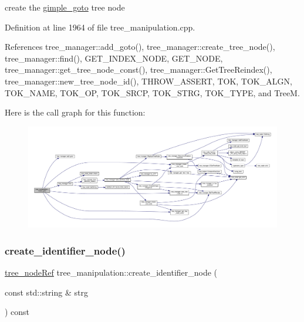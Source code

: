 create the \hyperlink{structgimple__goto}{gimple\+\_\+goto} tree node 

Definition at line 1964 of file tree\+\_\+manipulation.\+cpp.



References tree\+\_\+manager\+::add\+\_\+goto(), tree\+\_\+manager\+::create\+\_\+tree\+\_\+node(), tree\+\_\+manager\+::find(), G\+E\+T\+\_\+\+I\+N\+D\+E\+X\+\_\+\+N\+O\+DE, G\+E\+T\+\_\+\+N\+O\+DE, tree\+\_\+manager\+::get\+\_\+tree\+\_\+node\+\_\+const(), tree\+\_\+manager\+::\+Get\+Tree\+Reindex(), tree\+\_\+manager\+::new\+\_\+tree\+\_\+node\+\_\+id(), T\+H\+R\+O\+W\+\_\+\+A\+S\+S\+E\+RT, T\+OK, T\+O\+K\+\_\+\+A\+L\+GN, T\+O\+K\+\_\+\+N\+A\+ME, T\+O\+K\+\_\+\+OP, T\+O\+K\+\_\+\+S\+R\+CP, T\+O\+K\+\_\+\+S\+T\+RG, T\+O\+K\+\_\+\+T\+Y\+PE, and TreeM.

Here is the call graph for this function\+:
\nopagebreak
\begin{figure}[H]
\begin{center}
\leavevmode
\includegraphics[width=350pt]{d0/d99/classtree__manipulation_a4e8d0d39bc6d8c73d2642221fc3198a1_cgraph}
\end{center}
\end{figure}
\mbox{\label{classtree__manipulation_a5bfe50679122b1dc8fc2730c26ff9f71}} 
\subsubsection{\texorpdfstring{create\+\_\+identifier\+\_\+node()}{create\_identifier\_node()}}
{\footnotesize\ttfamily \hyperlink{tree__node_8hpp_a6ee377554d1c4871ad66a337eaa67fd5}{tree\+\_\+node\+Ref} tree\+\_\+manipulation\+::create\+\_\+identifier\+\_\+node (\begin{DoxyParamCaption}\item[{const std\+::string \&}]{strg }\end{DoxyParamCaption}) const}



